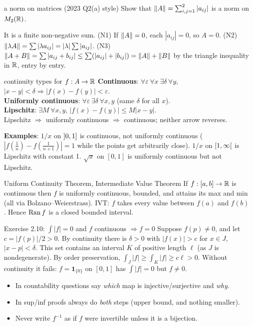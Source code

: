 \begin{exam}{a norm on matrices (2023 Q2(a) style)}
Show that $\left\lVert A\right\rVert=\sum_{i,j=1}^2|a_{ij}|$ is a norm on $M_2(\mathbb R)$.
\end{exam}
\begin{answer}
It is a finite non-negative sum. (N1) If $\left\lVert A\right\rVert=0$, each $|a_{ij}|=0$, so $A=0$.
(N2) $\left\lVert\lambda A\right\rVert=\sum|\lambda a_{ij}|=|\lambda|\sum|a_{ij}|$.
(N3) $\left\lVert A+B\right\rVert=\sum|a_{ij}+b_{ij}|\le\sum(|a_{ij}|+|b_{ij}|)=\left\lVert A\right\rVert+\left\lVert B\right\rVert$ by the triangle
inequality in $\mathbb R$, entry by entry.
\end{answer}

\begin{defn}{continuity types for $f:A\to\mathbb R$}
\textbf{Continuous}: $\forall\varepsilon\ \forall x\ \exists\delta\ \forall y$,
$|x-y|<\delta\Rightarrow|f(x)-f(y)|<\varepsilon$.\\
\textbf{Uniformly continuous}: $\forall\varepsilon\ \exists\delta\ \forall x,y$ (same $\delta$ for
all $x$).\\
\textbf{Lipschitz}: $\exists M\ \forall x,y$, $|f(x)-f(y)|\le M|x-y|$.\\
Lipschitz $\Rightarrow$ uniformly continuous $\Rightarrow$ continuous; neither arrow reverses.
\end{defn}
\textbf{Examples}: $1/x$ on $\mathopen{]}0,1\mathclose{]}$ is continuous, not uniformly continuous
($|f(\frac1n)-f(\frac1{n+1})|=1$ while the points get arbitrarily close). $1/x$ on
$\mathopen{[}1,\infty\mathclose{[}$ is Lipschitz with constant 1. $\sqrt x$ on $[0,1]$ is uniformly continuous but not
Lipschitz.

\begin{thm}{Uniform Continuity Theorem, Intermediate Value Theorem}
If $f:[a,b]\to\mathbb R$ is continuous then $f$ is uniformly continuous, bounded, and attains its max
and min (all via Bolzano--Weierstrass). IVT: $f$ takes every value between $f(a)$ and $f(b)$.
Hence $\operatorname{Ran} f$ is a closed bounded interval.
\end{thm}

\begin{example}{Exercise 2.10: $\int|f|=0$ and $f$ continuous $\Rightarrow f=0$}
Suppose $f(p)\ne0$, and let $c=|f(p)|/2>0$. By continuity there is $\delta>0$ with
$|f(x)|>c$ for $x\in J$, $|x-p|<\delta$. This set contains an interval $K$ of positive length
$\ell$ (as $J$ is nondegenerate). By order preservation, $\int_J|f|\ge\int_K|f|\ge c\ell>0$.
Without continuity it fails: $f=\mathbf 1_{\{0\}}$ on $[0,1]$ has $\int|f|=0$ but $f\ne0$.
\end{example}

\begin{tip}
\begin{itemize}
\item In countability questions say \emph{which} map is injective/surjective and \emph{why}.
\item In sup/inf proofs always do \emph{both} steps (upper bound, and nothing smaller).
\item Never write $f^{-1}$ as if $f$ were invertible unless it is a bijection.
\end{itemize}
\end{tip}

